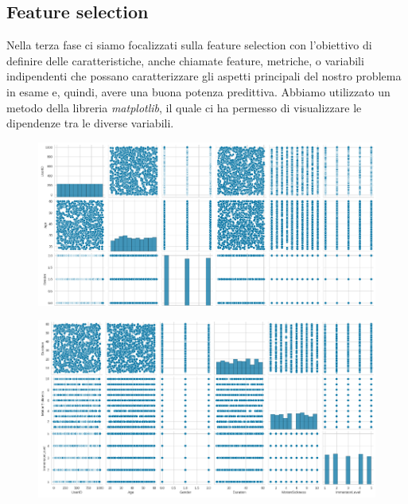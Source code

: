 \label{paragrafo 3.3}
\newpage
\subsection{Feature selection}
Nella terza fase ci siamo focalizzati sulla feature selection con l’obiettivo di definire delle caratteristiche, anche chiamate feature, metriche, o variabili indipendenti che possano caratterizzare gli aspetti principali del nostro problema in esame e, quindi, avere una buona potenza predittiva. Abbiamo utilizzato un metodo della libreria \textit{matplotlib}, il quale ci ha permesso di visualizzare le dipendenze tra le diverse variabili.

\begin{figure}[h]
    \centering
    \includegraphics[width=\textwidth]{MetaClassAI_Documentazione/3/img/FeatureSelection_1.png}
\end{figure}
\begin{figure}[h]
    \centering
    \includegraphics[width=\textwidth]{MetaClassAI_Documentazione/3/img/FeatureSelection_2.png}
\end{figure}